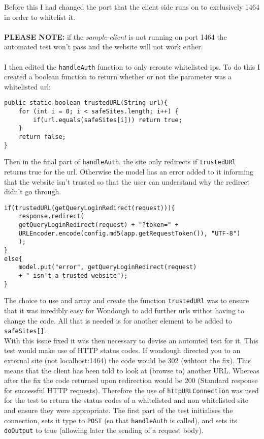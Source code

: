 Before this I had changed the port that the client side runs on to exclusively 1464 in order to whitelist it.\\ \\
\textbf{PLEASE NOTE:} if the \textit{sample-client} is not running on port 1464 the automated test won't pass and the website will not work either.\\ \\
I then edited the \verb|handleAuth| function to only reroute whitelisted ips. To do this I created a boolean function to return whether or not the parameter was a whitelisted url:
\begin{verbatim}
public static boolean trustedURL(String url){
    for (int i = 0; i < safeSites.length; i++) {
        if(url.equals(safeSites[i])) return true;
    }
    return false;
}
\end{verbatim}
Then in the final part of \verb|handleAuth|, the site only redirects if \verb|trustedURl| returns true for the url. Otherwise the model has an error added to it informing that the
website isn't trusted so that the user can understand why the redirect didn't go through.
\begin{verbatim}
if(trustedURL(getQueryLoginRedirect(request))){
    response.redirect(
    getQueryLoginRedirect(request) + "?token=" +
    URLEncoder.encode(config.md5(app.getRequestToken()), "UTF-8")
    );
}
else{
    model.put("error", getQueryLoginRedirect(request)
    + " isn't a trusted website");
}
\end{verbatim}
The choice to use and array and create the function \verb|trustedURl| was to ensure that it was inredibly easy for Wondough to add further urls withot having to change the code. All
that is needed is for another element to be added to \verb|safeSites[]|.\\
With this issue fixed it was then necessary to devise an automted test for it. This test would make use of HTTP status codes. If wondough directed you to an external site (not localhost:1464)
the code would be 302 (wihtout the fix). This means that the client has been told to look at (browse to) another URL. Whereas after the fix the code returned upon redirection would
be 200 (Standard response for successful HTTP requests)\cite{http}. Therefore the use of \verb|httpURLConnection| was used for the test to return the status codes of a whitelisted and
non whitelisted site and ensure they were appropriate. The first part of the test initialises the connection, sets it type to \verb|POST| (so that \verb|handleAuth| is called), and sets its \verb|doOutput| to true (allowing later the sending of a request body).
